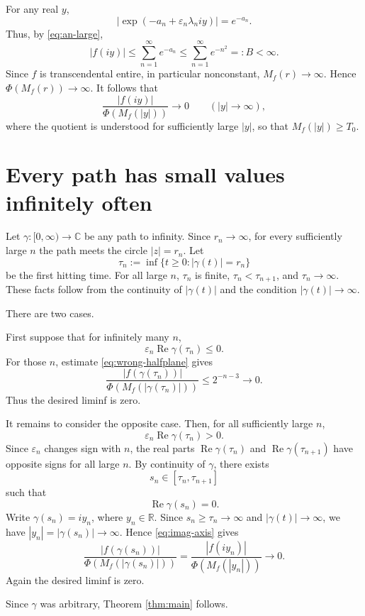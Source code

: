 \documentclass[11pt]{article}
\DeclareMathOperator{\Ree}{Re}
\newcommand{\C}{\mathbb C}
\begin{document}
For any real \(y\),
\[
\left|\exp(-a_n+\varepsilon_n\lambda_n i y)\right|=e^{-a_n}.
\]
Thus, by \eqref{eq:an-large},
\[
|f(iy)|
\le
\sum_{n=1}^{\infty} e^{-a_n}
\le
\sum_{n=1}^{\infty} e^{-n^2}
=:
B<\infty.
\]
Since \(f\) is transcendental entire, in particular nonconstant, \(M_f(r)\to
\infty\).  Hence \(\Phi(M_f(r))\to\infty\).  It follows that
\begin{equation}\label{eq:imag-axis}
\frac{|f(iy)|}{\Phi(M_f(|y|))}
\to 0
\qquad (|y|\to\infty),
\end{equation}
where the quotient is understood for sufficiently large \(|y|\), so that
\(M_f(|y|)\ge T_0\).

\section{Every path has small values infinitely often}

Let \(\gamma:[0,\infty)\to\C\) be any path to infinity.  Since \(r_n\to\infty\),
for every sufficiently large \(n\) the path meets the circle \(|z|=r_n\).  Let
\[
\tau_n:=\inf\{t\ge 0: |\gamma(t)|=r_n\}
\]
be the first hitting time.  For all large \(n\), \(\tau_n\) is finite,
\(\tau_n<\tau_{n+1}\), and \(\tau_n\to\infty\).  These facts follow from the
continuity of \(|\gamma(t)|\) and the condition \(|\gamma(t)|\to\infty\).

There are two cases.

First suppose that for infinitely many \(n\),
\[
\varepsilon_n\Ree \gamma(\tau_n)\le 0.
\]
For those \(n\), estimate \eqref{eq:wrong-halfplane} gives
\[
\frac{|f(\gamma(\tau_n))|}
{\Phi(M_f(|\gamma(\tau_n)|))}
\le
2^{-n-3}\to 0.
\]
Thus the desired liminf is zero.

It remains to consider the opposite case.  Then, for all sufficiently large
\(n\),
\[
\varepsilon_n\Ree \gamma(\tau_n)>0.
\]
Since \(\varepsilon_n\) changes sign with \(n\), the real parts
\(\Ree \gamma(\tau_n)\) and \(\Ree \gamma(\tau_{n+1})\) have opposite signs for
all large \(n\).  By continuity of \(\gamma\), there exists
\[
s_n\in[\tau_n,\tau_{n+1}]
\]
such that
\[
\Ree \gamma(s_n)=0.
\]
Write \(\gamma(s_n)=iy_n\), where \(y_n\in\mathbb R\).  Since
\(s_n\ge\tau_n\to\infty\) and \(|\gamma(t)|\to\infty\), we have
\(|y_n|=|\gamma(s_n)|\to\infty\).  Hence \eqref{eq:imag-axis} gives
\[
\frac{|f(\gamma(s_n))|}
{\Phi(M_f(|\gamma(s_n)|))}
=
\frac{|f(iy_n)|}{\Phi(M_f(|y_n|))}
\to 0.
\]
Again the desired liminf is zero.

Since \(\gamma\) was arbitrary, Theorem \ref{thm:main} follows.
\end{document}

